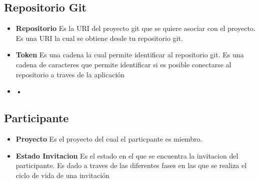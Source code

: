 \subsection{Repositorio Git}

\begin{itemize}
	\item \textbf{Repositorio} Es la URI del proyecto git que se quiere asociar con el proyecto. Es una URI la cual se obtiene desde tu repositorio git.
	\item \textbf{Token} Es una cadena la cual permite identificar al repositorio git. Es una cadena de caracteres que permite identificar si es posible conectarse al repositorio a traves de la aplicación
	\item \textbf{•}
\end{itemize}

\subsection{Participante}
\begin{itemize}
	\item \textbf{Proyecto} Es el proyecto del cual el particpante es miembro.
	\item \textbf{Estado Invitacion} Es el estado en el que se encuentra la invitacion del participante. Es dado a traves de las diferentes fases en las que se realiza el ciclo de vida de una invitación
\end{itemize}